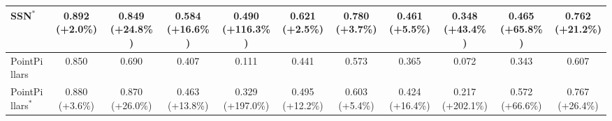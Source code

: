 \begin{table}[htpb]
\begin{tabular}{lcccccccccc}
    SSN$^*$ & 0.892 (+2.0\%) & 0.849 (+24.8\%) & 0.584 (+16.6\%) & 0.490 (+116.3\%) & 0.621 (+2.5\%) & 0.780 (+3.7\%) & 0.461 (+5.5\%) & 0.348 (+43.4\%) & 0.465 (+65.8\%) & 0.762 (+21.2\%) \\
    \midrule
    PointPillars & 0.850 & 0.690 & 0.407 & 0.111 & 0.441 & 0.573 & 0.365 & 0.072 & 0.343 & 0.607 \\
    PointPillars$^*$ & 0.880 (+3.6\%) & 0.870 (+26.0\%) & 0.463 (+13.8\%) & 0.329 (+197.0\%) & 0.495 (+12.2\%) & 0.603 (+5.4\%) & 0.424 (+16.4\%) & 0.217 (+202.1\%) & 0.572 (+66.6\%) & 0.767 (+26.4\%) \\
    \bottomrule
    \end{tabular}
    \label{tab:ap_results_2.0}
\end{table}

